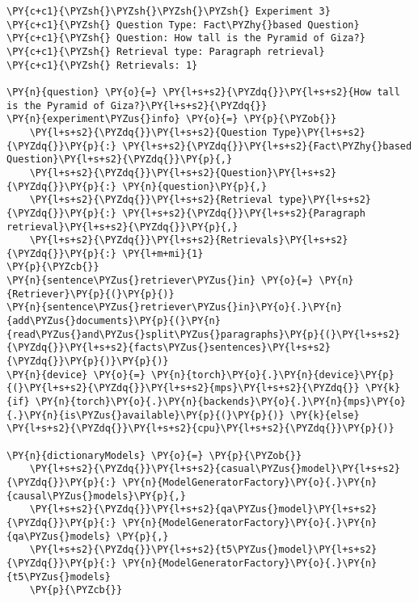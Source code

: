 \documentclass[11pt]{wseas}
\begin{document}
    \begin{tcolorbox}[breakable, size=fbox, boxrule=1pt, pad at break*=1mm,colback=cellbackground, colframe=cellborder]
\begin{Verbatim}[commandchars=\\\{\}]
\PY{c+c1}{\PYZsh{}\PYZsh{}\PYZsh{}\PYZsh{} Experiment 3}
\PY{c+c1}{\PYZsh{} Question Type: Fact\PYZhy{}based Question}
\PY{c+c1}{\PYZsh{} Question: How tall is the Pyramid of Giza?}
\PY{c+c1}{\PYZsh{} Retrieval type: Paragraph retrieval}
\PY{c+c1}{\PYZsh{} Retrievals: 1}

\PY{n}{question} \PY{o}{=} \PY{l+s+s2}{\PYZdq{}}\PY{l+s+s2}{How tall is the Pyramid of Giza?}\PY{l+s+s2}{\PYZdq{}}
\PY{n}{experiment\PYZus{}info} \PY{o}{=} \PY{p}{\PYZob{}}
    \PY{l+s+s2}{\PYZdq{}}\PY{l+s+s2}{Question Type}\PY{l+s+s2}{\PYZdq{}}\PY{p}{:} \PY{l+s+s2}{\PYZdq{}}\PY{l+s+s2}{Fact\PYZhy{}based Question}\PY{l+s+s2}{\PYZdq{}}\PY{p}{,}
    \PY{l+s+s2}{\PYZdq{}}\PY{l+s+s2}{Question}\PY{l+s+s2}{\PYZdq{}}\PY{p}{:} \PY{n}{question}\PY{p}{,}
    \PY{l+s+s2}{\PYZdq{}}\PY{l+s+s2}{Retrieval type}\PY{l+s+s2}{\PYZdq{}}\PY{p}{:} \PY{l+s+s2}{\PYZdq{}}\PY{l+s+s2}{Paragraph retrieval}\PY{l+s+s2}{\PYZdq{}}\PY{p}{,}
    \PY{l+s+s2}{\PYZdq{}}\PY{l+s+s2}{Retrievals}\PY{l+s+s2}{\PYZdq{}}\PY{p}{:} \PY{l+m+mi}{1}
\PY{p}{\PYZcb{}}
\PY{n}{sentence\PYZus{}retriever\PYZus{}in} \PY{o}{=} \PY{n}{Retriever}\PY{p}{(}\PY{p}{)}
\PY{n}{sentence\PYZus{}retriever\PYZus{}in}\PY{o}{.}\PY{n}{add\PYZus{}documents}\PY{p}{(}\PY{n}{read\PYZus{}and\PYZus{}split\PYZus{}paragraphs}\PY{p}{(}\PY{l+s+s2}{\PYZdq{}}\PY{l+s+s2}{facts\PYZus{}sentences}\PY{l+s+s2}{\PYZdq{}}\PY{p}{)}\PY{p}{)}
\PY{n}{device} \PY{o}{=} \PY{n}{torch}\PY{o}{.}\PY{n}{device}\PY{p}{(}\PY{l+s+s2}{\PYZdq{}}\PY{l+s+s2}{mps}\PY{l+s+s2}{\PYZdq{}} \PY{k}{if} \PY{n}{torch}\PY{o}{.}\PY{n}{backends}\PY{o}{.}\PY{n}{mps}\PY{o}{.}\PY{n}{is\PYZus{}available}\PY{p}{(}\PY{p}{)} \PY{k}{else} \PY{l+s+s2}{\PYZdq{}}\PY{l+s+s2}{cpu}\PY{l+s+s2}{\PYZdq{}}\PY{p}{)}

\PY{n}{dictionaryModels} \PY{o}{=} \PY{p}{\PYZob{}}
    \PY{l+s+s2}{\PYZdq{}}\PY{l+s+s2}{casual\PYZus{}model}\PY{l+s+s2}{\PYZdq{}}\PY{p}{:} \PY{n}{ModelGeneratorFactory}\PY{o}{.}\PY{n}{causal\PYZus{}models}\PY{p}{,} 
    \PY{l+s+s2}{\PYZdq{}}\PY{l+s+s2}{qa\PYZus{}model}\PY{l+s+s2}{\PYZdq{}}\PY{p}{:} \PY{n}{ModelGeneratorFactory}\PY{o}{.}\PY{n}{qa\PYZus{}models} \PY{p}{,}
    \PY{l+s+s2}{\PYZdq{}}\PY{l+s+s2}{t5\PYZus{}model}\PY{l+s+s2}{\PYZdq{}}\PY{p}{:} \PY{n}{ModelGeneratorFactory}\PY{o}{.}\PY{n}{t5\PYZus{}models} 
    \PY{p}{\PYZcb{}}


\end{Verbatim}
\end{tcolorbox}
\end{document}
